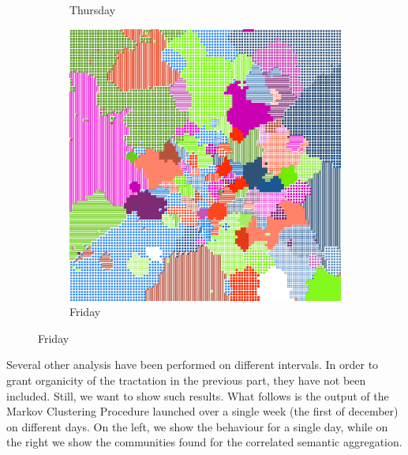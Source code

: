 \documentclass[12pt,a4paper]{article}
\begin{document}
\begin{figure}[H]
\begin{subfigure}[b]{0.35\textwidth}
\caption{Thursday}
\end{subfigure}
\begin{subfigure}[b]{0.35\textwidth}
\includegraphics[width=\textwidth]{weekDef/5Fri.png}
\caption{Friday}
\end{subfigure}
\end{figure}

Several other analysis have been performed on different intervals. In order to grant organicity of the tractation in the previous part, they have not been included.
Still, we want to show such results.
What follows is the output of the Markov Clustering Procedure launched over a single week (the first of december) on different days. On the left, we show the behaviour for a single day, while on the right we show the communities found for the correlated semantic aggregation.
\end{document}
